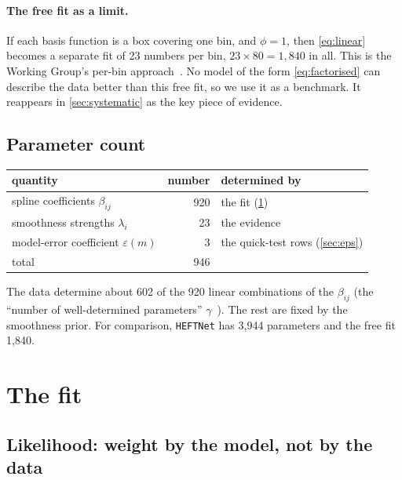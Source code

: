 \documentclass[11pt]{article}
\newcommand{\code}[1]{\texttt{#1}}
\begin{document}
\paragraph{The free fit as a limit.} If each basis function is a box covering one bin, and
$\phi = 1$, then \cref{eq:linear} becomes a separate fit of 23 numbers per bin, $23\times80 =
1{,}840$ in all. This is the Working Group's per-bin approach~\cite{alasfar}. No model of the
form \cref{eq:factorised} can describe the data better than this free fit, so we use it as a
benchmark. It reappears in \cref{sec:systematic} as the key piece of evidence.

\subsection{Parameter count}

\begin{center}
\begin{tabular}{lrl}
\toprule
quantity & number & determined by\\
\midrule
spline coefficients $\beta_{ij}$ & 920 & the fit (\cref{sec:fit})\\
smoothness strengths $\lambda_i$ & 23 & the evidence\\
model-error coefficient $\varepsilon(m)$ & 3 & the quick-test rows (\cref{sec:eps})\\
\midrule
total & 946 & \\
\bottomrule
\end{tabular}
\end{center}
The data determine about 602 of the 920 linear combinations of the $\beta_{ij}$ (the
``number of well-determined parameters'' $\gamma$~\cite{mackay}). The rest are fixed by the
smoothness prior. For comparison, \code{HEFTNet} has 3,944 parameters and the free fit 1,840.

\section{The fit}
\label{sec:fit}

\subsection{Likelihood: weight by the model, not by the data}
\end{document}
